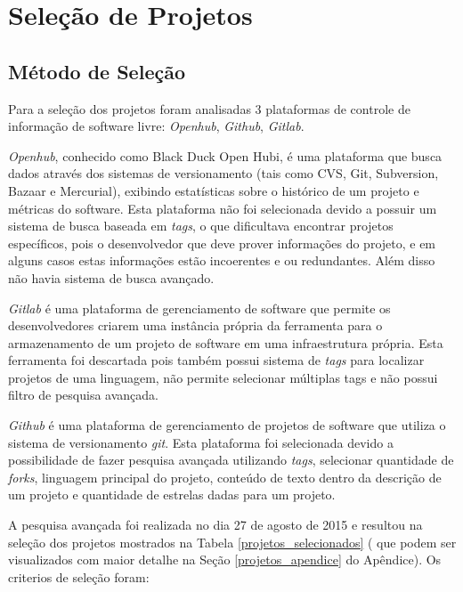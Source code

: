 \section{Seleção de Projetos}

\subsection{Método de Seleção}

Para a seleção dos projetos foram analisadas 3 plataformas de controle de informação
de software livre: \textit{Openhub}, \textit{Github}, \textit{Gitlab}.

\textit{Openhub}, conhecido como Black Duck Open Hubi, é uma plataforma que busca dados através
 dos sistemas de versionamento (tais como CVS, Git, Subversion, Bazaar e Mercurial),
 exibindo estatísticas sobre o histórico de um projeto e métricas do software.
 Esta plataforma não foi selecionada devido a possuir um sistema de busca baseada em \textit{tags},
 o que dificultava encontrar projetos específicos, pois o desenvolvedor que deve prover
 informações do projeto, e em alguns casos estas informações estão incoerentes e ou
 redundantes. Além disso não havia sistema de busca avançado.

\textit{Gitlab} é uma plataforma de gerenciamento de software que permite os
 desenvolvedores criarem uma instância própria da ferramenta para o armazenamento
 de um projeto de software em uma infraestrutura própria. Esta ferramenta foi
 descartada pois também possui sistema de \textit{tags} para localizar projetos de uma linguagem,
não permite selecionar múltiplas tags e não possui filtro de pesquisa avançada.

\textit{Github} é uma plataforma de gerenciamento de projetos de software que
utiliza o sistema de versionamento \textit{git}. Esta plataforma foi selecionada devido a
 possibilidade de fazer pesquisa avançada utilizando \textit{tags}, selecionar quantidade de \textit{forks},
 linguagem principal do projeto, conteúdo de texto dentro da descrição de um projeto e
 quantidade de estrelas dadas para um projeto.

A pesquisa avançada foi realizada no dia 27 de agosto de 2015 e resultou na seleção dos
 projetos mostrados na Tabela \ref{projetos_selecionados}
 ( que podem ser visualizados com maior detalhe na Seção 
\ref{projetos_apendice} do Apêndice). Os criterios de seleção foram: 

